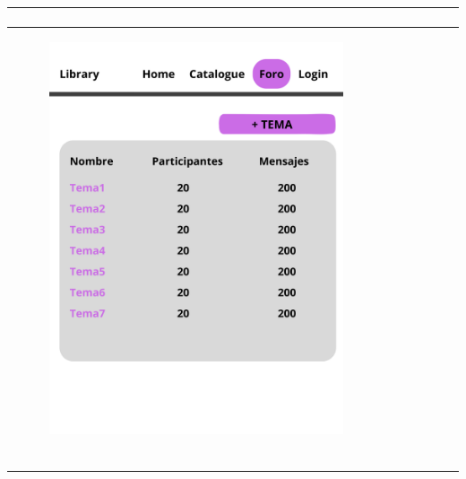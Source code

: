 \documentclass{report}
\begin{document}
\begin{center}
\begin{longtable}{|p{\linewidth}|}
\begin{figure}[H]
                        \end{figure}\\
                        \hline
                        \begin{figure}[H]
                            \centering
                            \includegraphics[width=0.8\textwidth]{./img/grafico/Foro2.png}
                        \end{figure}\\
                        \hline
                        \begin{figure}[H]
                            \centering

\end{figure}
\end{longtable}
\end{center}
\end{document}
